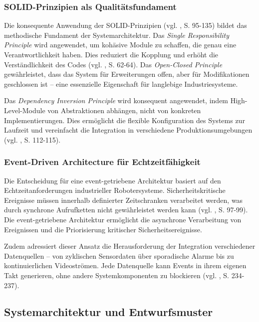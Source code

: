 \subsubsection{SOLID-Prinzipien als Qualitätsfundament}
Die konsequente Anwendung der SOLID-Prinzipien (vgl. , S.
95-135) bildet das methodische Fundament der Systemarchitektur. Das
\textit{Single Responsibility Principle} wird angewendet, um kohäsive Module zu
schaffen, die genau eine Verantwortlichkeit haben. Dies reduziert die Kopplung
und erhöht die Verständlichkeit des Codes (vgl. , S.
62-64). Das \textit{Open-Closed Principle} gewährleistet, dass das System für
Erweiterungen offen, aber für Modifikationen geschlossen ist – eine essenzielle
Eigenschaft für langlebige Industriesysteme.

Das \textit{Dependency Inversion Principle} wird konsequent angewendet, indem
High-Level-Module von Abstraktionen abhängen, nicht von konkreten
Implementierungen. Dies ermöglicht die flexible Konfiguration des Systems zur
Laufzeit und vereinfacht die Integration in verschiedene Produktionsumgebungen
(vgl. , S. 112-115).

\subsubsection{Event-Driven Architecture für Echtzeitfähigkeit}
Die Entscheidung für eine event-getriebene Architektur basiert auf den
Echtzeitanforderungen industrieller Robotersysteme. Sicherheitskritische
Ereignisse müssen innerhalb definierter Zeitschranken verarbeitet werden, was
durch synchrone Aufrufketten nicht gewährleistet werden kann (vgl.
, S. 97-99). Die event-getriebene Architektur ermöglicht die
asynchrone Verarbeitung von Ereignissen und die Priorisierung kritischer
Sicherheitsereignisse.

Zudem adressiert dieser Ansatz die Herausforderung der Integration
verschiedener Datenquellen – von zyklischen Sensordaten über sporadische Alarme
bis zu kontinuierlichen Videoströmen. Jede Datenquelle kann Events in ihrem
eigenen Takt generieren, ohne andere Systemkomponenten zu blockieren (vgl.
, S. 234-237).

\subsection{Systemarchitektur und Entwurfsmuster}

